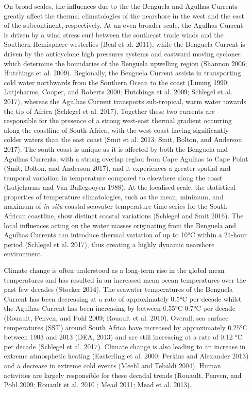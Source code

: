 \documentclass[10pt,a4paper,]{article}
\begin{document}
On broad scales, the influences due to the the Benguela and Agulhas
Currents greatly affect the thermal climatologies of the nearshore in
the west and the east of the subcontinent, respectively. At an even
broader scale, the Agulhas Current is driven by a wind stress curl
between the southeast trade winds and the Southern Hemisphere westerlies
(Beal et al. 2011), while the Benguela Current is driven by the
anticyclone high pressures systems and eastward moving cyclones which
determine the boundaries of the Benguela upwelling region (Shannon 2006;
Hutchings et al. 2009). Regionally, the Benguela Current assists in
transporting cold water northwards from the Southern Ocean to the coast
(Lüning 1990; Lutjeharms, Cooper, and Roberts 2000; Hutchings et al.
2009; Schlegel et al. 2017), whereas the Agulhas Current transports
sub-tropical, warm water towards the tip of Africa (Schlegel et al.
2017). Together these two currents are responsible for the presence of a
strong west-east thermal gradient occurring along the coastline of South
Africa, with the west coast having significantly colder waters than the
east coast (Smit et al. 2013; Smit, Bolton, and Anderson 2017). The
south coast is unique as it is affected by both the Benguela and Agulhas
Currents, with a strong overlap region from Cape Agulhas to Cape Point
(Smit, Bolton, and Anderson 2017), and it experiences a greater spatial
and temporal variation in temperature compared to elsewhere along the
coast (Lutjeharms and Van Ballegooyen 1988). At the localised scale, the
statistical properties of temperature climatologies, such as the mean,
minimum, and maximum of \emph{in situ} coastal seawater temperature time
series for the South African coastline, show distinct coastal variations
(Schlegel and Smit 2016). The local influences acting on the water
masses originating from the Benguela and Agulhas Currents can introduce
thermal variation of up to 10°C within a 24-hour period (Schlegel et al.
2017), thus creating a highly dynamic nearshore environment.

Climate change is often understood as a long-term rise in the global
mean temperatures and has resulted in an increased mean ocean
temperatures over the past few decades (Stocker 2014). The seawater
temperatures of the Benguela Current has been decreasing at a rate of
approximately 0.5°C per decade whilst the Agulhas Current has been
increasing by between 0.55°C-0.7°C per decade (Rouault, Penven, and Pohl
2009; Rouault et al. 2010). Overall, sea surface temperatures (SST)
around South Africa have increased by approximately 0.25°C between 1903
and 2013 (DEA, 2013) and are still increasing at a rate of 0.12 °C per
decade (Schlegel et al. 2017). Climate change is also leading to an
increase in extreme atmosphetic heating (Easterling et al. 2000; Perkins
and Alexander 2013) and a decrease in extreme cold events (Meehl and
Tebaldi 2004). Human activities are largely responsible for these
decadal trends (Rouault, Penven, and Pohl 2009; Rouault et al. 2010 ;
Mead 2011; Mead et al. 2013).
\end{document}
